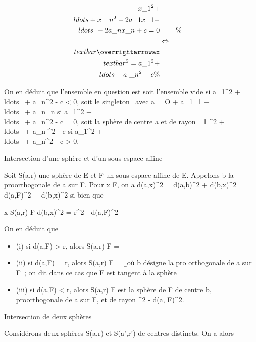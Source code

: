 \documentclass[]{article}
\begin{document}
\begin{align*} x\_1^2 +
\\ldots + x~\_
n^2 - 2a\_ 1x\_1
-\\ldots~ -
2a\_nx\_n + c = 0&&\%&
\\ & \Leftrightarrow &
\\textbar{}\overrightarrowax\\textbar{}^2
= a\_ 1^2 +
\\ldots + a~\_
n^2 - c\%& \\
\end{align*}

On en déduit que l'ensemble en question est soit l'ensemble vide si
a\_1^2 +
\\ldots~ +
a\_n^2 - c \textless{} 0, soit le singleton
\a\ avec a = O +
a\_1\vece\_1 +
\\ldots~ +
a\_n\vece\_n si a\_1^2
+ \\ldots~ +
a\_n^2 - c = 0, soit la sphère de centre a et de rayon
\sqrta\_1 ^2  +
\\ldots~ +
a\_n ^2  - c si a\_1^2 +
\\ldots~ +
a\_n^2 - c \textgreater{} 0.

Intersection d'une sphère et d'un sous-espace affine

Soit S(a,r) une sphère de E et F un sous-espace affine de E. Appelons b
la pro\jmathection orthogonale de a sur F. Pour x \in F, on a
d(a,x)^2 = d(a,b)^2 + d(b,x)^2 =
d(a,F)^2 + d(b,x)^2 si bien que

x \in S(a,r) \bigcap F \Leftrightarrow d(b,x)^2 =
r^2 - d(a,F)^2

On en déduit que

\begin{itemize}
\itemsep1pt\parskip0pt
\item
  (i) si d(a,F) \textgreater{} r, alors S(a,r) \bigcap F = \varnothing~
\item
  (ii) si d(a,F) = r, alors S(a,r) \bigcap F =
  \b\ où b désigne la pro\jmathection
  orthogonale de a sur F~; on dit dans ce cas que F est tangent à la
  sphère
\item
  (iii) si d(a,F) \textless{} r, alors S(a,r) \bigcap F est la sphère de F de
  centre b, pro\jmathection orthogonale de a sur F, et de rayon
  \sqrtr^2  - d(a, F)^2.
\end{itemize}

Intersection de deux sphères

Considérons deux sphères S(a,r) et S(a',r') de centres distincts. On a
alors
\end{document}
